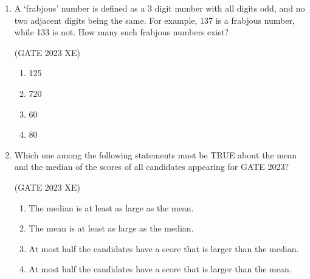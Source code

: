 \documentclass[journal,12pt,onecolumn]{IEEEtran}
\begin{document}
\begin{enumerate}
\begin{multicols}{4}
\begin{enumerate}
\end{enumerate}

\end{multicols}

\item A ‘frabjous’ number is defined as a 3 digit number with all digits odd, and no two 
adjacent digits being the same. For example, 137 is a frabjous number, while 133 
is not. How many such frabjous numbers exist?

\hfill{(GATE 2023 XE)}

\begin{multicols}{4}

\begin{enumerate}

\item 125

\item 720

\item 60

\item 80

\end{enumerate}

\end{multicols}

\item Which one among the following statements must be TRUE about the mean and 
the  median of the scores of all candidates appearing for GATE 2023?

\hfill{(GATE 2023 XE)}

\begin{multicols}{2}

\begin{enumerate}

\item The median is at least as large as the mean.

\item The mean is at least as large as the median.

\item At most half the candidates have a score that is larger than the median.

\item At most half the candidates have a score that is larger than the mean.

\end{enumerate}

\end{multicols}

\newpage


\end{enumerate}
\end{document}
